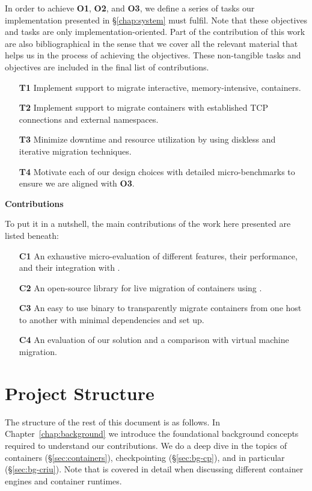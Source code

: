 In order to achieve \textbf{O1}, \textbf{O2}, and \textbf{O3}, we define a series of tasks our implementation presented in \S\ref{chap:system} must fulfil.
Note that these objectives and tasks are only implementation-oriented.
Part of the contribution of this work are also bibliographical in the sense that we cover all the relevant material that helps us in the process of achieving the objectives.
These non-tangible tasks and objectives are included in the final list of contributions.
\begin{itemize}
    \item[\textbf{T1}] Implement support to migrate interactive, memory-intensive, containers.
    \item[\textbf{T2}] Implement support to migrate containers with established TCP connections and external namespaces.
    \item[\textbf{T3}] Minimize downtime and resource utilization by using diskless and iterative migration techniques.
    \item[\textbf{T4}] Motivate each of our design choices with detailed micro-benchmarks to ensure we are aligned with \textbf{O3}.
\end{itemize}

\textbf{Contributions}

To put it in a nutshell, the main contributions of the work here presented are listed beneath:
\begin{itemize}
    \item[\textbf{C1}] An exhaustive micro-evaluation of different \criu features, their performance, and their integration with \runc.
    \item[\textbf{C2}] An open-source library for live migration of \runc containers using \criu.
    \item[\textbf{C3}] An easy to use binary to transparently migrate containers from one host to another with minimal dependencies and set up.
    \item[\textbf{C4}] An evaluation of our solution and a comparison with virtual machine migration.
\end{itemize}

\section{Project Structure}

The structure of the rest of this document is as follows.
In Chapter~\ref{chap:background} we introduce the foundational background concepts required to understand our contributions.
We do a deep dive in the topics of containers (\S\ref{sec:containers}), checkpointing (\S\ref{sec:bg-cp}), and \criu in particular (\S\ref{sec:bg-criu}).
Note that \runc is covered in detail when discussing different container engines and container runtimes.

